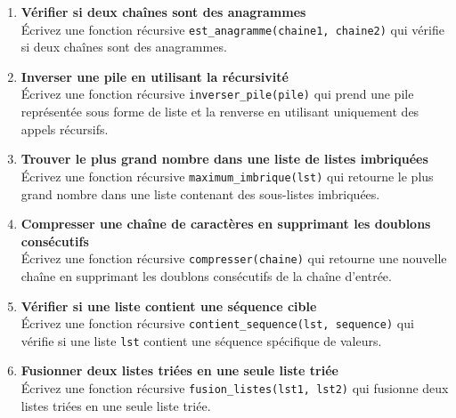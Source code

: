 \begin{enumerate}
    \item \textbf{Vérifier si deux chaînes sont des anagrammes} \\
    Écrivez une fonction récursive \texttt{est\_anagramme(chaine1, chaine2)} qui vérifie si deux chaînes sont des anagrammes.

    \item \textbf{Inverser une pile en utilisant la récursivité} \\
    Écrivez une fonction récursive \texttt{inverser\_pile(pile)} qui prend une pile représentée sous forme de liste et la renverse en utilisant uniquement des appels récursifs.

    \item \textbf{Trouver le plus grand nombre dans une liste de listes imbriquées} \\
    Écrivez une fonction récursive \texttt{maximum\_imbrique(lst)} qui retourne le plus grand nombre dans une liste contenant des sous-listes imbriquées.

    \item \textbf{Compresser une chaîne de caractères en supprimant les doublons consécutifs} \\
    Écrivez une fonction récursive \texttt{compresser(chaine)} qui retourne une nouvelle chaîne en supprimant les doublons consécutifs de la chaîne d'entrée.

    \item \textbf{Vérifier si une liste contient une séquence cible} \\
    Écrivez une fonction récursive \texttt{contient\_sequence(lst, sequence)} qui vérifie si une liste \texttt{lst} contient une séquence spécifique de valeurs.

    \item \textbf{Fusionner deux listes triées en une seule liste triée} \\
    Écrivez une fonction récursive \texttt{fusion\_listes(lst1, lst2)} qui fusionne deux listes triées en une seule liste triée.

\end{enumerate}
